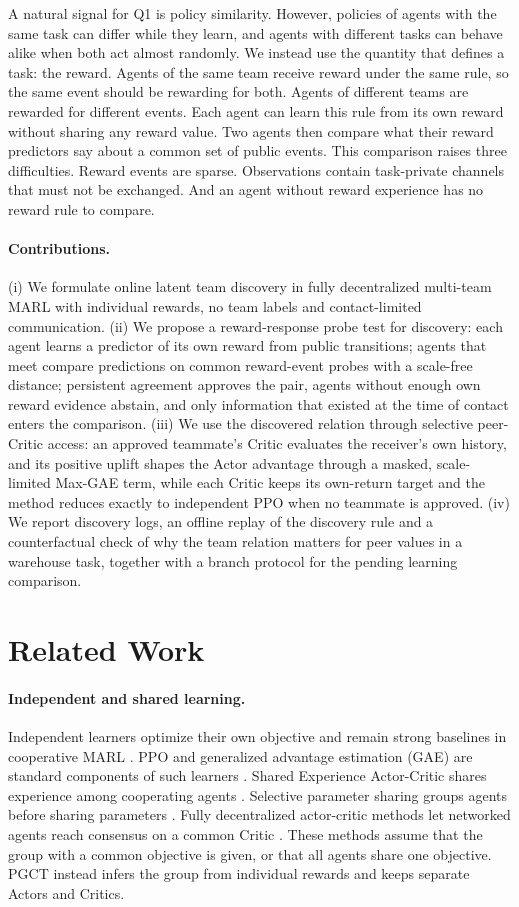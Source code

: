 \documentclass{article}
\begin{document}
A natural signal for Q1 is policy similarity. However, policies of agents with the same task can differ while they learn, and agents with different tasks can behave alike when both act almost randomly. We instead use the quantity that defines a task: the reward. Agents of the same team receive reward under the same rule, so the same event should be rewarding for both. Agents of different teams are rewarded for different events. Each agent can learn this rule from its own reward without sharing any reward value. Two agents then compare what their reward predictors say about a common set of public events. This comparison raises three difficulties. Reward events are sparse. Observations contain task-private channels that must not be exchanged. And an agent without reward experience has no reward rule to compare.

\paragraph{Contributions.} (i) We formulate online latent team discovery in fully decentralized multi-team MARL with individual rewards, no team labels and contact-limited communication. (ii) We propose a reward-response probe test for discovery: each agent learns a predictor of its own reward from public transitions; agents that meet compare predictions on common reward-event probes with a scale-free distance; persistent agreement approves the pair, agents without enough own reward evidence abstain, and only information that existed at the time of contact enters the comparison. (iii) We use the discovered relation through selective peer-Critic access: an approved teammate's Critic evaluates the receiver's own history, and its positive uplift shapes the Actor advantage through a masked, scale-limited Max-GAE term, while each Critic keeps its own-return target and the method reduces exactly to independent PPO when no teammate is approved. (iv) We report discovery logs, an offline replay of the discovery rule and a counterfactual check of why the team relation matters for peer values in a warehouse task, together with a branch protocol for the pending learning comparison.

\section{Related Work}
\paragraph{Independent and shared learning.}
Independent learners optimize their own objective and remain strong baselines in cooperative MARL \cite{tan,ippo,benchmark}. PPO and generalized advantage estimation (GAE) are standard components of such learners \cite{ppo,gae,mappo}. Shared Experience Actor-Critic shares experience among cooperating agents \cite{seac}. Selective parameter sharing groups agents before sharing parameters \cite{seps}. Fully decentralized actor-critic methods let networked agents reach consensus on a common Critic \cite{fdmarl}. These methods assume that the group with a common objective is given, or that all agents share one objective. PGCT instead infers the group from individual rewards and keeps separate Actors and Critics.
\end{document}
